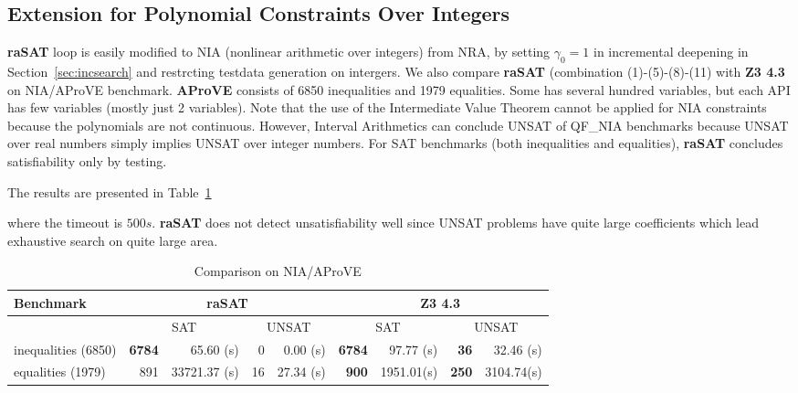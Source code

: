 \documentclass[runningheads,a4paper,oribibl]{llncs}
\newcommand{\suppress}[1]{} %
\begin{document}
\subsection{Extension for Polynomial Constraints Over Integers} \label{sec:NIA}

{\bf raSAT} loop is easily modified to NIA (nonlinear arithmetic over integers) from NRA, 
by setting $\gamma_0 = 1$ in incremental deepening in Section~\ref{sec:incsearch} 
and restrcting testdata generation on intergers. 
We also compare {\bf raSAT} (combination (1)-(5)-(8)-(11) with {\bf Z3 4.3} on NIA/AProVE benchmark. 
{\bf AProVE} consists of 6850 inequalities and 1979 equalities. 
Some has several hundred variables, but each API has few variables (mostly just 2 variables). Note that the use of the Intermediate Value Theorem cannot be applied for NIA constraints because the polynomials are not continuous. However, Interval Arithmetics can conclude UNSAT of QF\_NIA benchmarks because UNSAT over real numbers simply implies UNSAT over integer numbers. For SAT benchmarks (both inequalities and equalities), \textbf{raSAT} concludes satisfiability only by testing.

The results are presented in Table~\ref{tab:aprove}
\suppress{
\begin{itemize}
\item {\bf raSAT} detects 6773 SAT in 90.22s, and 2 UNSAT in 378.04s. 
\item {\bf Z3 4.3} detects 6784 SAT in 97.70s, and 36 UNSAT in 32.08s. 
\end{itemize}
}
where the timeout is $500s$. 
{\bf raSAT} does not detect unsatisfiability well since UNSAT problems have quite large coefficients
which lead exhaustive search on quite large area.

\begin{table}[t]
\centering
\begin{tabular}{ | l | r | r | r | r  | r | r | r | r |}
\hline
    \multicolumn{1}{|l|}{Benchmark} & 
    \multicolumn{4}{c|}{\bf raSAT} & \multicolumn{4}{c|}{\bf Z3 4.3}\\
\hline
    & \multicolumn{2}{c}{SAT} & \multicolumn{2}{|c}{UNSAT} 
    & \multicolumn{2}{|c}{SAT} & \multicolumn{2}{|c|}{UNSAT} \\
\hline
inequalities (6850) & \textbf{6784} & 65.60 (s) & 0 & 0.00 (s) & \textbf{6784} & 97.77 (s) & \textbf{36} & 32.46 (s) 
\\
\hline
equalities (1979) & 891 & 33721.37 (s) & 16 & 27.34 (s) & \textbf{900} & 1951.01(s) & \textbf{250} & 3104.74(s) 
\\
\hline
\end{tabular}
\medskip 
\caption{Comparison on NIA/AProVE} \label{tab:aprove}
\end{table}
\end{document}
